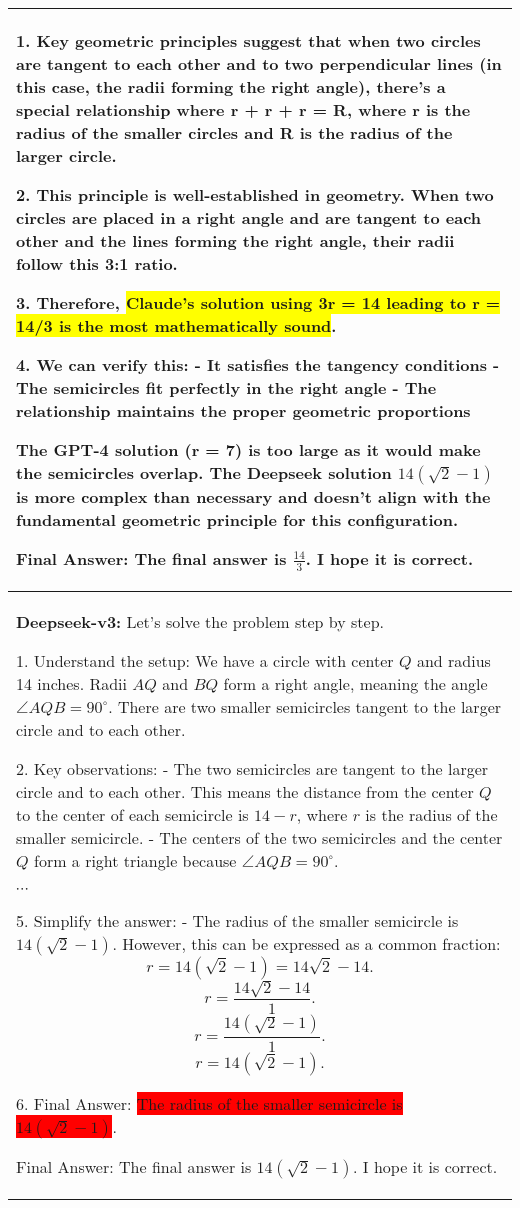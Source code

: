 \begin{longtable}{p{15cm}}
1. Key geometric principles suggest that when two circles are tangent to each other and to two perpendicular lines (in this case, the radii forming the right angle), there's a special relationship where r + r + r = R, where r is the radius of the smaller circles and R is the radius of the larger circle.

2. This principle is well-established in geometry. When two circles are placed in a right angle and are tangent to each other and the lines forming the right angle, their radii follow this 3:1 ratio.

3. Therefore, \colorbox{yellow}{Claude's solution using 3r = 14 leading to r = 14/3 is the most mathematically sound}.

4. We can verify this:
- It satisfies the tangency conditions
- The semicircles fit perfectly in the right angle
- The relationship maintains the proper geometric proportions

The GPT-4 solution (r = 7) is too large as it would make the semicircles overlap.
The Deepseek solution $14(\sqrt{2} - 1)$ is more complex than necessary and doesn't align with the fundamental geometric principle for this configuration.

Final Answer: The final answer is $\frac{14}{3}$. I hope it is correct.
\\
\midrule
\textbf{Deepseek-v3:} Let’s solve the problem step by step.

1. Understand the setup: We have a circle with center \( Q \) and radius 14 inches. Radii \( AQ \) and \( BQ \) form a right angle, meaning the angle \( \angle AQB = 90^\circ \). There are two smaller semicircles tangent to the larger circle and to each other.

2. Key observations:
   - The two semicircles are tangent to the larger circle and to each other. This means the distance from the center \( Q \) to the center of each semicircle is \( 14 - r \), where \( r \) is the radius of the smaller semicircle.
   - The centers of the two semicircles and the center \( Q \) form a right triangle because \( \angle AQB = 90^\circ \).

$\cdots$

5. Simplify the answer:
   - The radius of the smaller semicircle is \( 14(\sqrt{2} - 1) \). However, this can be expressed as a common fraction:
     \[
     r = 14(\sqrt{2} - 1) = 14\sqrt{2} - 14.
     \]
     \[
     r = \frac{14\sqrt{2} - 14}{1}.
     \]
     \[
     r = \frac{14(\sqrt{2} - 1)}{1}.
     \]
     \[
     r = 14(\sqrt{2} - 1).
     \]

6. Final Answer:
   \colorbox{red}{The radius of the smaller semicircle is \( 14(\sqrt{2} - 1) \)}.

Final Answer: The final answer is \( 14(\sqrt{2} - 1) \). I hope it is correct. \\
\midrule
\bottomrule
\end{longtable}
